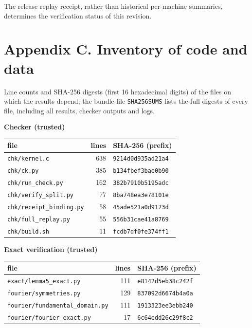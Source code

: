 \documentclass[
  11pt,
]{article}
\newcounter{none} %
\begin{document}
The release replay receipt, rather than historical per-machine
summaries, determines the verification status of this revision.

\section{Appendix C. Inventory of code and
data}\label{appendix-c.-inventory-of-code-and-data}

Line counts and SHA-256 digests (first 16 hexadecimal digits) of the
files on which the results depend; the bundle file \texttt{SHA256SUMS}
lists the full digests of every file, including all results, checker
outputs and logs.

\textbf{Checker (trusted)}

{\def\LTcaptype{none} %
\begin{longtable}[]{@{}lrl@{}}
\toprule\noalign{}
file & lines & SHA-256 (prefix) \\
\midrule\noalign{}
\endhead
\bottomrule\noalign{}
\endlastfoot
\texttt{chk/kernel.c} & 638 & \texttt{9214d0d935ad21a4} \\
\texttt{chk/ck.py} & 385 & \texttt{b134fbef3bae0b90} \\
\texttt{chk/run\_check.py} & 162 & \texttt{382b7910b5195adc} \\
\texttt{chk/verify\_split.py} & 77 & \texttt{8ba748ea3e78101e} \\
\texttt{chk/receipt\_binding.py} & 58 & \texttt{45ade521a0d9173d} \\
\texttt{chk/full\_replay.py} & 55 & \texttt{556b31cae41a8769} \\
\texttt{chk/build.sh} & 11 & \texttt{fcdb7df0fe374ff1} \\
\end{longtable}
}

\textbf{Exact verification (trusted)}

{\def\LTcaptype{none} %
\begin{longtable}[]{@{}lrl@{}}
\toprule\noalign{}
file & lines & SHA-256 (prefix) \\
\midrule\noalign{}
\endhead
\bottomrule\noalign{}
\endlastfoot
\texttt{exact/lemma5\_exact.py} & 111 & \texttt{e8142d5eb38c242f} \\
\texttt{fourier/symmetries.py} & 129 & \texttt{837092d6674b4a0a} \\
\texttt{fourier/fundamental\_domain.py} & 111 &
\texttt{1913323ee3ebb240} \\
\texttt{fourier/fourier\_exact.py} & 17 & \texttt{6c64edd26c29f8c2} \\
\end{longtable}
}
\end{document}
